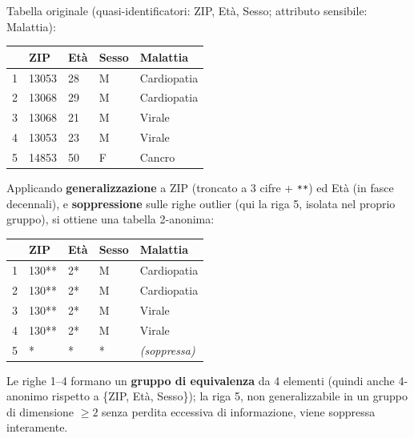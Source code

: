 \documentclass[a4paper,11pt]{article}
\begin{document}
\begin{esempio}
Tabella originale (quasi-identificatori: ZIP, Et\`{a}, Sesso; attributo sensibile: Malattia):
\begin{center}
\small
\begin{tabular}{lllll}
\toprule
& ZIP & Et\`{a} & Sesso & Malattia \\
\midrule
1 & 13053 & 28 & M & Cardiopatia \\
2 & 13068 & 29 & M & Cardiopatia \\
3 & 13068 & 21 & M & Virale \\
4 & 13053 & 23 & M & Virale \\
5 & 14853 & 50 & F & Cancro \\
\bottomrule
\end{tabular}
\end{center}
Applicando \textbf{generalizzazione} a ZIP (troncato a 3 cifre + \texttt{**}) ed Et\`{a} (in fasce decennali), e \textbf{soppressione} sulle righe outlier (qui la riga 5, isolata nel proprio gruppo), si ottiene una tabella 2-anonima:
\begin{center}
\small
\begin{tabular}{lllll}
\toprule
& ZIP & Et\`{a} & Sesso & Malattia \\
\midrule
1 & 130** & 2* & M & Cardiopatia \\
2 & 130** & 2* & M & Cardiopatia \\
3 & 130** & 2* & M & Virale \\
4 & 130** & 2* & M & Virale \\
5 & * & * & * & \emph{(soppressa)} \\
\bottomrule
\end{tabular}
\end{center}
Le righe 1--4 formano un \textbf{gruppo di equivalenza} da 4 elementi (quindi anche 4-anonimo rispetto a \{ZIP, Et\`{a}, Sesso\}); la riga 5, non generalizzabile in un gruppo di dimensione $\geq 2$ senza perdita eccessiva di informazione, viene soppressa interamente.
\end{esempio}
\end{document}
